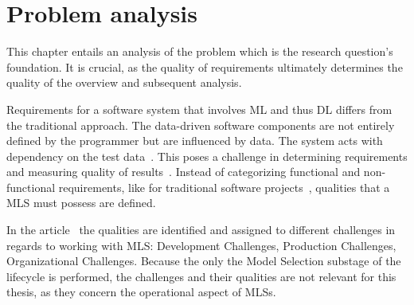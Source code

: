 \chapter{Problem analysis}\label{ch:problem}
This chapter entails an analysis of the problem which is the research question's foundation.
It is crucial, as the quality of requirements ultimately determines the quality of the overview and
subsequent analysis.

Requirements for a software system that involves \ac{ML} and thus \ac{DL} differs from
the traditional approach. The data-driven software components are not entirely defined by the
programmer but are influenced by data.
The system acts with dependency on the test data~\citep{siebert_construction_2021}.
This poses a challenge in determining requirements and measuring quality of
results~\citep{nakamichi_requirements-driven_2020}.
Instead of categorizing functional and non-functional requirements, like for traditional
software projects~\citep{zowghi_requirements_2014}, qualities that a \ac{MLS} must possess
are defined.

In the article~\cite{ashmore_assuring_2021} the qualities are identified and assigned to different
challenges in regards to working with \ac{MLS}: Development Challenges, Production Challenges,
Organizational Challenges.
Because the only the Model Selection substage of the lifecycle is performed, the challenges and their
qualities are not relevant for this thesis, as they concern the operational aspect of \acp{MLS}.

